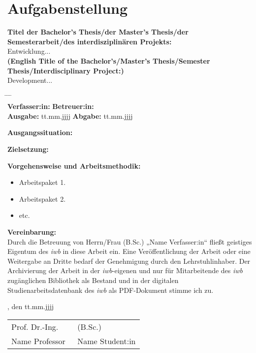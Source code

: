 \chapter*{Aufgabenstellung}


\textbf{Titel der Bachelor's Thesis/der Master's Thesis/der Semesterarbeit/des interdisziplinären Projekts:}\\
\Large{Entwicklung...}\\
\newline
\normalsize{\textbf{(English Title of the Bachelor's/Master's Thesis/Semester Thesis/In\-ter\-dis\-ci\-pli\-na\-ry Project:)}}\\
\Large{Development...}
\normalsize

\begin{tabbing}
	\hspace{7em} 		\= \hspace{13em}			\= \hspace{7em} 		\= \kill
				\> 						\> \\
	\textbf{Verfasser:in:} \>  	\> \textbf{Betreuer:in:} 	\>  \\
	\textbf{Ausgabe:} 	\> tt.mm.jjjj 	\> \textbf{Abgabe:} 	\> tt.mm.jjjj
\end{tabbing}

\vspace{5mm}
\textbf{Ausgangssituation:}\\
\blindtext

\vspace{5mm}
\textbf{Zielsetzung:}\\
\blindtext

\vspace{5mm}
\textbf{Vorgehensweise und Arbeitsmethodik:}
\begin{itemize}
	\item Arbeitspaket 1.
	\item Arbeitspaket 2.
	\item etc.
\end{itemize}
\vspace{1.0cm}
\textbf{Vereinbarung:}\\
Durch die Betreuung von Herrn/Frau (B.Sc.) „Name Verfasser:in“ fließt geistiges Eigentum des \textit{iwb} in diese Arbeit ein. Eine Veröffentlichung der Arbeit oder eine Weitergabe an Dritte bedarf der Genehmigung durch den Lehrstuhlinhaber. Der Archivierung der Arbeit in der \textit{iwb}-eigenen und nur für Mitarbeitende des \textit{iwb} zugänglichen Bibliothek als Bestand und in der digitalen Studienarbeitsdatenbank des \textit{iwb} als PDF-Dokument stimme ich zu.

\vfill

\IWBaddressCityChair, den tt.mm.jjjj
\vspace{2.5cm}\\
\begin{tabular}{p{0.5\linewidth}p{0.5\linewidth} }
	Prof. Dr.-Ing.		& (B.Sc.)\\
	Name Professor  	& Name Student:in
\end{tabular}
